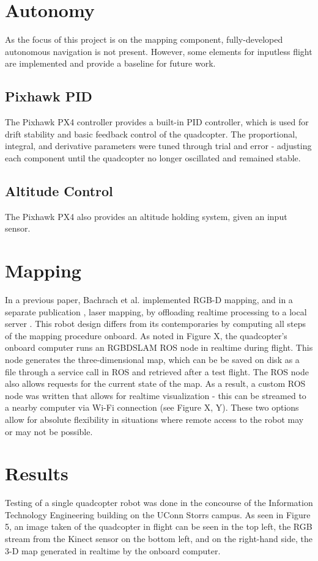 \documentclass[letterpaper, oneside, 10pt]{report}
\begin{document}
\section{Autonomy}
As the focus of this project is on the mapping component, fully-developed autonomous navigation is not present. However, some elements for inputless flight are implemented and provide a baseline for future work.

    \subsection{Pixhawk PID}
    The Pixhawk PX4 controller provides a built-in PID controller, which is used for drift stability and basic feedback control of the quadcopter. The proportional, integral, and derivative parameters were tuned through trial and error - adjusting each component until the quadcopter no longer oscillated and remained stable.

    \subsection{Altitude Control}

    The Pixhawk PX4 also provides an altitude holding system, given an input sensor.

\section{Mapping}

In a previous paper, Bachrach et al. implemented RGB-D mapping, and in a separate publication \cite{bachrach2011range}, laser mapping, by offloading realtime processing to a local server \cite{bachrach2012estimation}.  This robot design differs from its contemporaries by computing all steps of the mapping procedure onboard. As noted in Figure X, the quadcopter's onboard computer runs an RGBDSLAM ROS node in realtime during flight. This node generates the three-dimensional map, which can be be saved on disk as a file through a service call in ROS and retrieved after a test flight. The ROS node also allows requests for the current state of the map. As a result, a custom ROS node was written that allows for realtime visualization - this can be streamed to a nearby computer via Wi-Fi connection (see Figure X, Y). These two options allow for absolute flexibility in situations where remote access to the robot may or may not be possible.

\section{Results}
\noindent Testing of a single quadcopter robot was done in the concourse of the Information Technology Engineering building on the UConn Storrs campus. As seen in Figure 5, an image taken of the quadcopter in flight can be seen in the top left, the RGB stream from the Kinect sensor on the bottom left, and on the right-hand side, the 3-D map generated in realtime by the onboard computer.
\end{document}

